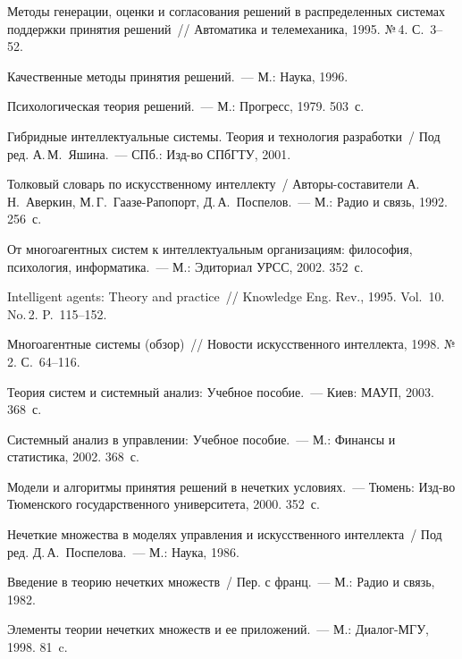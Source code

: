 \begin{multicols}{2}
{{\begin{thebibliography}{99}
Методы генерации, оценки и согласования решений в распределенных 
системах поддержки принятия решений~// Автоматика и телемеханика, 1995. 
№\,4. С.~3--52.

Качественные методы принятия решений.~--- М.: Наука, 1996.

Психологическая теория решений.~--- М.: Прогресс, 1979.  503~с.

Гибридные интеллектуальные сис\-те\-мы. Теория и технология разработки~/ Под 
ред. А.\,М.~Яшина.~--- СПб.: Изд-во СПбГТУ, 2001.

Толковый словарь по искусственному интеллекту~/ Авторы-составители 
А.\,Н.~Аверкин, М.\,Г.~Гаазе-Рапопорт, Д.\,А.~Поспелов.~--- М.: Радио и связь, 
1992. 256~с.

От многоагентных систем к интеллектуальным организациям: философия, 
психология, информатика.~--- М.: Эдиториал УРСС, 2002.  352~с.

Intelligent agents: Theory and practice~// Knowledge Eng. Rev., 1995. 
Vol.~10. No.\,2. P.~115--152.

Многоагентные системы (обзор)~// Новости искусственного интеллекта, 1998. 
№\,2. С.~64--116.

Теория систем и системный анализ: Учебное пособие.~--- Киев: МАУП, 2003.  
368~с.

Сис\-тем\-ный анализ в управлении: Учебное пособие.~--- М.: Финансы и 
статистика, 2002.  368~с.

Модели и алгоритмы принятия решений в нечетких условиях.~--- Тюмень: 
Изд-во Тюменского государственного университета, 2000.  352~с.

Нечеткие множества в моделях управления и искусственного интеллекта~/ Под 
ред. Д.\,А.~Поспелова.~--- М.: Наука, 1986.


\label{end\stat}

Введение в теорию нечетких множеств~/ Пер. с франц.~--- М.: Радио и связь, 
1982.

Элементы теории нечетких множеств и ее приложений.~--- М.: Диалог-МГУ, 
1998.  81~c.
 \end{thebibliography}
}
}
\end{multicols}